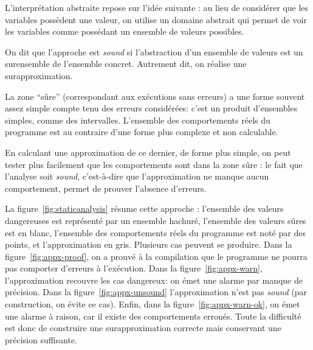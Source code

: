 L'interprétation abstraite repose sur l'idée suivante : au lieu de considérer
que les variables possèdent une valeur, on utilise un domaine abstrait qui
permet de voir les variables comme possédant un ensemble de valeurs possibles.

On dit que l'approche est \emph{sound} si l'abstraction d'un ensemble de valeurs
est un surensemble de l'ensemble concret. Autrement dit, on réalise une
surapproximation.

La zone \enquote{sûre} (correspondant aux exécutions sans erreurs) a une forme
souvent assez simple compte tenu des erreurs considérées: c'est un produit
d'ensembles simples, comme des intervalles. L'ensemble des comportements réels
du programme est au contraire d'une forme plus complexe et non calculable.

En calculant une approximation de ce dernier, de forme plus simple, on peut
tester plus facilement que les comportements sont dans la zone sûre : le fait
que l'analyse soit \emph{sound}, c'est-à-dire que l'approximation ne manque
aucun comportement, permet de prouver l'absence d'erreurs.

La figure~\ref{fig:staticanalysis} résume cette approche : l'ensemble des
valeurs dangereuses est représenté par un ensemble hachuré, l'ensemble des
valeurs sûres est en blanc, l'ensemble des comportements réels du programme est
noté par des points, et l'approximation en gris. Plusieurs cas peuvent se
produire. Dans la figure~\ref{fig:appx-proof}, on a prouvé à la compilation que
le programme ne pourra pas comporter d'erreurs à l'exécution. Dans la
figure~\ref{fig:appx-warn}, l'approximation recouvre les cas dangereux: on émet
une alarme par manque de précision. Dans la figure~\ref{fig:appx-unsound}
l'approximation n'est pas \emph{sound} (par construction, on évite ce cas).
Enfin, dans la figure~\ref{fig:appx-warn-ok}, on émet une alarme à raison, car il
existe des comportements erronés. Toute la difficulté est donc de construire une
surapproximation correcte mais conservant une précision suffisante.


